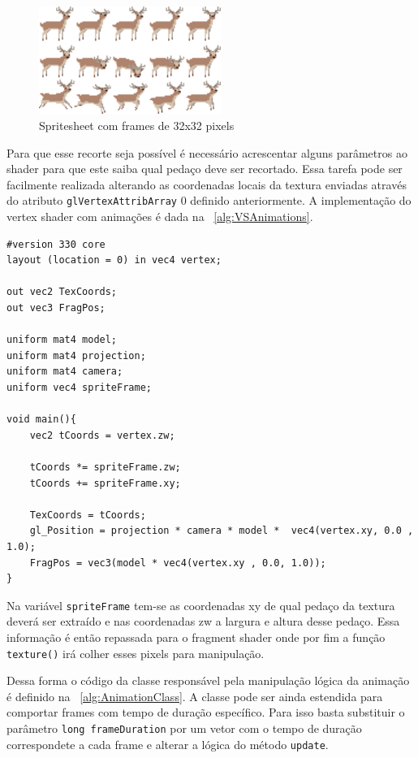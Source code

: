 \documentclass[12pt, 
openright, 
oneside, 
a4paper,    
brazil]{facom-ufu-abntex2}
\begin{document}
\begin{figure}[H]
	\centering
	\includegraphics[width=16em]{imagens/spritesheet.png}
	\caption{Spritesheet com frames de 32x32 pixels}
	\label{fig:spritesheetExample}
\end{figure}
Para que esse recorte seja possível é necessário acrescentar alguns parâmetros ao shader para que este saiba qual pedaço deve ser recortado. Essa tarefa pode ser facilmente realizada alterando as coordenadas locais da textura enviadas através do atributo \texttt{glVertexAttribArray} 0 definido anteriormente. A implementação do vertex shader com animações é dada na \lstlistingname~\ref{alg:VSAnimations}.


\begin{lstlisting}[caption=Vertex shader com animações, label={alg:VSAnimations}]
#version 330 core
layout (location = 0) in vec4 vertex;

out vec2 TexCoords;
out vec3 FragPos;

uniform mat4 model;
uniform mat4 projection;
uniform mat4 camera;
uniform vec4 spriteFrame;

void main(){
	vec2 tCoords = vertex.zw;

	tCoords *= spriteFrame.zw;
	tCoords += spriteFrame.xy;

	TexCoords = tCoords;
	gl_Position = projection * camera * model *  vec4(vertex.xy, 0.0 , 1.0);
	FragPos = vec3(model * vec4(vertex.xy , 0.0, 1.0));
}
\end{lstlisting}

Na variável \texttt{spriteFrame} tem-se as coordenadas xy de qual pedaço da textura deverá ser extraído e nas coordenadas zw a largura e altura desse pedaço. Essa informação é então repassada  para o fragment shader onde por fim a função \texttt{texture()} irá colher esses pixels para manipulação.

Dessa forma o código da classe responsável pela manipulação lógica da animação é definido na \lstlistingname~\ref{alg:AnimationClass}. A classe pode ser ainda estendida para comportar frames com tempo de duração específico. Para isso basta substituir o parâmetro \texttt{long frameDuration} por um vetor com o tempo de duração correspondete a cada frame e alterar a lógica do método \texttt{update}.
\end{document}
